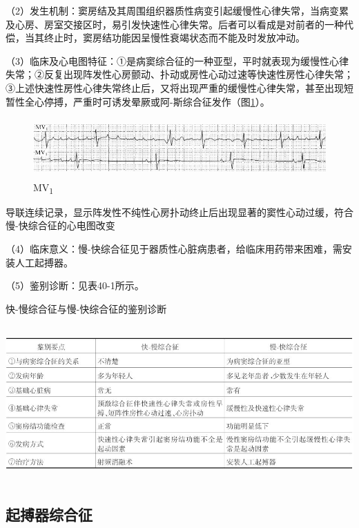 （2）发生机制：窦房结及其周围组织器质性病变引起缓慢性心律失常，当病变累及心房、房室交接区时，易引发快速性心律失常。后者可以看成是对前者的一种代偿，当其终止时，窦房结功能因呈慢性衰竭状态而不能及时发放冲动。

（3）临床及心电图特征：①是病窦综合征的一种亚型，平时就表现为缓慢性心律失常；②反复出现阵发性心房颤动、扑动或房性心动过速等快速性房性心律失常；③上述快速性房性心律失常终止后，又将出现严重的缓慢性心律失常，甚至出现短暂性全心停搏，严重时可诱发晕厥或阿-斯综合征发作（图\ref{fig40-12}）。

\begin{figure}[!htbp]
 \centering
 \includegraphics[width=5.58333in,height=0.89583in]{./images/Image00673.jpg}
 \captionsetup{justification=centering}
 \caption{MV\textsubscript{1}}
 \label{fig40-12}
  \end{figure} 
导联连续记录，显示阵发性不纯性心房扑动终止后出现显著的窦性心动过缓，符合慢-快综合征的心电图改变

（4）临床意义：慢-快综合征见于器质性心脏病患者，给临床用药带来困难，需安装人工起搏器。

（5）鉴别诊断：见表40-1所示。

\begin{table}[htbp]
\centering
\caption{快-慢综合征与慢-快综合征的鉴别诊断}
\label{tab40-1}
\includegraphics[width=6.23958in,height=2.35417in]{./images/Image00674.jpg}
\end{table}

\protect\hypertarget{text00047.htmlux5cux23subid560}{}{}

\subsection{起搏器综合征}

